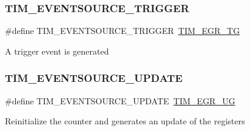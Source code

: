 \subsubsection{\texorpdfstring{TIM\_EVENTSOURCE\_TRIGGER}{TIM\_EVENTSOURCE\_TRIGGER}}
{\footnotesize\ttfamily \#define T\+I\+M\+\_\+\+E\+V\+E\+N\+T\+S\+O\+U\+R\+C\+E\+\_\+\+T\+R\+I\+G\+G\+ER~\mbox{\hyperlink{group___peripheral___registers___bits___definition_ga2eabface433d6adaa2dee3df49852585}{T\+I\+M\+\_\+\+E\+G\+R\+\_\+\+TG}}}

A trigger event is generated \mbox{\label{group___t_i_m___event___source_ga6b9d1352735d2ddbafcaa31ae05cd1ee}} 
\subsubsection{\texorpdfstring{TIM\_EVENTSOURCE\_UPDATE}{TIM\_EVENTSOURCE\_UPDATE}}
{\footnotesize\ttfamily \#define T\+I\+M\+\_\+\+E\+V\+E\+N\+T\+S\+O\+U\+R\+C\+E\+\_\+\+U\+P\+D\+A\+TE~\mbox{\hyperlink{group___peripheral___registers___bits___definition_ga16f52a8e9aad153223405b965566ae91}{T\+I\+M\+\_\+\+E\+G\+R\+\_\+\+UG}}}

Reinitialize the counter and generates an update of the registers 
